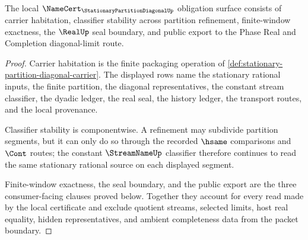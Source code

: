 \begin{theorem}
\label{thm:stationary-partition-diagonal-namecert-obligations}
The local $\NameCert_{\StationaryPartitionDiagonalUp}$ obligation surface consists of carrier habitation, classifier stability across partition refinement, finite-window exactness, the $\RealUp$ seal boundary, and public export to the Phase Real and Completion diagonal-limit route.
\end{theorem}
\begin{proof}
Carrier habitation is the finite packaging operation of \autoref{def:stationary-partition-diagonal-carrier}. The displayed rows name the stationary rational inputs, the finite partition, the diagonal representatives, the constant stream classifier, the dyadic ledger, the real seal, the history ledger, the transport routes, and the local provenance.

Classifier stability is componentwise. A refinement may subdivide partition segments, but it can only do so through the recorded $\hsame$ comparisons and $\Cont$ routes; the constant $\StreamNameUp$ classifier therefore continues to read the same stationary rational source on each displayed segment.

Finite-window exactness, the seal boundary, and the public export are the three consumer-facing clauses proved below. Together they account for every read made by the local certificate and exclude quotient streams, selected limits, host real equality, hidden representatives, and ambient completeness data from the packet boundary.
\end{proof}

